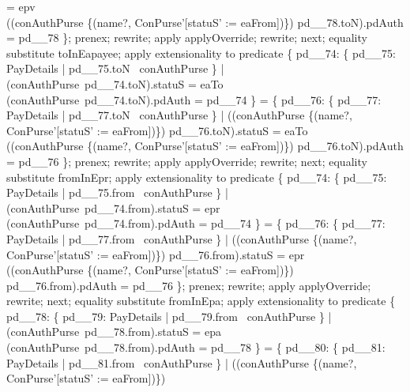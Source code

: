 \begin{LPScript}
                    = epv \\
            \land ((conAuthPurse
                    \oplus \{(name?, \theta ConPurse'[statuS' := eaFrom])\})
                    pd\_\_78.toN).pdAuth
                    = pd\_\_78 \};
    prenex;
    rewrite;
    apply applyOverride;
    rewrite;
    next;
    equality substitute toInEapayee;
    apply extensionality to predicate
    \{ pd\_\_74: \{ pd\_\_75: PayDetails | pd\_\_75.toN \in \dom~conAuthPurse \}
        |       (conAuthPurse~pd\_\_74.toN).statuS = eaTo \\
            \land (conAuthPurse~pd\_\_74.toN).pdAuth = pd\_\_74 \}
    = \{ pd\_\_76: \{ pd\_\_77: PayDetails | pd\_\_77.toN \in \dom~conAuthPurse \}
            |       ((conAuthPurse
                    \oplus \{(name?, \theta ConPurse'[statuS' := eaFrom])\})
                    pd\_\_76.toN).statuS
                    = eaTo \\
            \land ((conAuthPurse
                    \oplus \{(name?, \theta ConPurse'[statuS' := eaFrom])\})
                    pd\_\_76.toN).pdAuth
                    = pd\_\_76 \};
    prenex;
    rewrite;
    apply applyOverride;
    rewrite;
    next;
    equality substitute fromInEpr;
    apply extensionality to predicate
    \{ pd\_\_74: \{ pd\_\_75: PayDetails | pd\_\_75.from \in \dom~conAuthPurse \}
        |       (conAuthPurse~pd\_\_74.from).statuS = epr \\
            \land (conAuthPurse~pd\_\_74.from).pdAuth = pd\_\_74 \}
    = \{ pd\_\_76:
            \{ pd\_\_77: PayDetails | pd\_\_77.from \in \dom~conAuthPurse \}
            |       ((conAuthPurse
                    \oplus \{(name?, \theta ConPurse'[statuS' := eaFrom])\})
                    pd\_\_76.from).statuS
                    = epr \\
            \land ((conAuthPurse
                    \oplus \{(name?, \theta ConPurse'[statuS' := eaFrom])\})
                    pd\_\_76.from).pdAuth
                    = pd\_\_76 \};
    prenex;
    rewrite;
    apply applyOverride;
    rewrite;
    next;
    equality substitute fromInEpa;
    apply extensionality to predicate
    \{ pd\_\_78: \{ pd\_\_79: PayDetails | pd\_\_79.from \in \dom~conAuthPurse \}
        |       (conAuthPurse~pd\_\_78.from).statuS = epa \\
            \land (conAuthPurse~pd\_\_78.from).pdAuth = pd\_\_78 \}
    = \{ pd\_\_80:
            \{ pd\_\_81: PayDetails | pd\_\_81.from \in \dom~conAuthPurse \}
            |       ((conAuthPurse
                    \oplus \{(name?, \theta ConPurse'[statuS' := eaFrom])\})

\end{LPScript}
